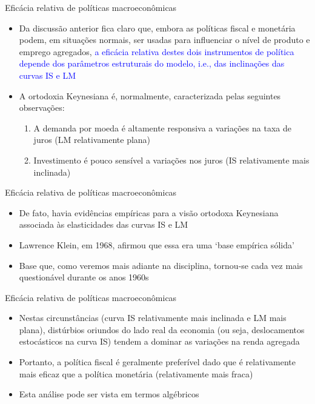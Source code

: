 \documentclass[10pt]{beamer}
\begin{document}
\begin{frame}{Eficácia relativa de políticas macroeconômicas}
    \begin{itemize}
        \item Da discussão anterior fica claro que, embora as políticas fiscal e monetária podem, em situações normais, ser usadas para influenciar o nível de produto e emprego agregados, \textcolor{blue}{a eficácia relativa destes dois instrumentos de política depende dos parâmetros estruturais do modelo, i.e., das inclinações das curvas IS e LM}
        \bigskip
        \item A ortodoxia Keynesiana é, normalmente, caracterizada pelas seguintes observações:
        \bigskip
        \begin{enumerate}
            \item A demanda por moeda é altamente responsiva a variações na taxa de juros (LM relativamente plana)
            \medskip
            \item Investimento é pouco sensível a variações nos juros (IS relativamente mais inclinada)
        \end{enumerate}
    \end{itemize}
\end{frame}

\begin{frame}{Eficácia relativa de políticas macroeconômicas}
    \begin{itemize}
        \item De fato, havia evidências empíricas para a visão ortodoxa Keynesiana associada às elasticidades das curvas IS e LM
        \bigskip
        \item Lawrence Klein, em 1968, afirmou que essa era uma `base empírica sólida'
        \bigskip
        \item Base que, como veremos mais adiante na disciplina, tornou-se cada vez mais questionável durante os anos 1960s
    \end{itemize}
\end{frame}

\begin{frame}{Eficácia relativa de políticas macroeconômicas}
    \begin{itemize}
        \item Nestas circunstâncias (curva IS relativamente mais inclinada e LM mais plana), distúrbios oriundos do lado real da economia (ou seja, deslocamentos estocásticos na curva IS) tendem a dominar as variações na renda agregada
        \bigskip
        \item Portanto, a política fiscal é geralmente preferível dado que é relativamente mais eficaz que a política monetária (relativamente mais fraca)
        \bigskip
        \item Esta análise pode ser vista em termos algébricos
    \end{itemize}
\end{frame}
\end{document}
